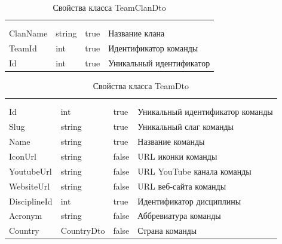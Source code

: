 \begin{xltabular}{\textwidth}{|X|X|X|X|}
	\caption{Свойства класса TeamClanDto}\label{table:TeamClanDto}\\ \hline
	 &  &  &  \\ \hline
	 &  &  &  \\ \hline
	\endfirsthead
	 \hline
	 &  &  &  \\ \hline
	\endhead
	ClanName & string & true & Название клана \\ \hline
	TeamId & int & true & Идентификатор команды \\ \hline
	Id & int & true & Уникальный идентификатор \\ \hline
\end{xltabular}

\begin{xltabular}{\textwidth}{|X|X|X|X|}
	\caption{Свойства класса TeamDto}\label{table:TeamDto}\\ \hline
	 &  &  &  \\ \hline
	 &  &  &  \\ \hline
	\endfirsthead
	 \hline
	 &  &  &  \\ \hline
	\endhead
	Id & int & true & Уникальный идентификатор команды \\ \hline
	Slug & string & true & Уникальный слаг команды \\ \hline
	Name & string & true & Название команды \\ \hline
	IconUrl & string & false & URL иконки команды \\ \hline
	YoutubeUrl & string & false & URL YouTube канала команды \\ \hline
	WebsiteUrl & string & false & URL веб-сайта команды \\ \hline
	DisciplineId & int & true & Идентификатор дисциплины \\ \hline
	Acronym & string & false & Аббревиатура команды \\ \hline
	Country & CountryDto & false & Страна команды \\ \hline
\end{xltabular}

